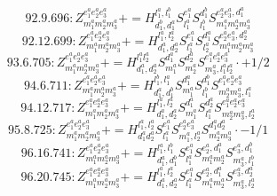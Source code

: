 \documentclass[letterpaper,10pt,fleqn,leqno,onecolumn]{article}
\begin{document}
\begin{equation} \;\;\;\;\;\;  92.9.696: Z^{e_{1}^{a}e_{2}^{a}e_{3}^{a}}_{m_{1}^{a}m_{2}^{a}m_{3}^{a}}+=H^{l_{1}^{a},l_{1}^{b}}_{d_{1}^{b},d_{1}^{a}}S^{e_{1}^{a}}_{l_{1}^{a}}S^{d_{1}^{b}}_{l_{1}^{b}}S^{e_{2}^{a}e_{3}^{a},d_{1}^{a}}_{m_{1}^{a}m_{2}^{a}m_{3}^{a}} \end{equation}
\begin{equation} \;\;\;\;\;\;  92.12.699: Z^{e_{1}^{a}e_{2}^{a}e_{3}^{a}}_{m_{1}^{a}m_{2}^{a}m_{3}^{a}}+=H^{l_{1}^{a},l_{2}^{a}}_{d_{1}^{a},d_{2}^{a}}S^{e_{1}^{a}}_{l_{1}^{a}}S^{d_{1}^{a}}_{l_{2}^{a}}S^{e_{2}^{a}e_{3}^{a},d_{2}^{a}}_{m_{1}^{a}m_{2}^{a}m_{3}^{a}} \end{equation}
\begin{equation} \;\;\;\;\;\;  93.6.705: Z^{e_{1}^{a}e_{2}^{a}e_{3}^{a}}_{m_{1}^{a}m_{2}^{a}m_{3}^{a}}+=H^{l_{1}^{a}l_{2}^{a}}_{d_{1}^{a},d_{2}^{a}}S^{d_{1}^{a}}_{m_{1}^{a}}S^{d_{2}^{a}}_{m_{2}^{a}}S^{e_{1}^{a}e_{2}^{a}e_{3}^{a}}_{m_{3}^{a},l_{1}^{a}l_{2}^{a}}\cdot +1/2 \end{equation}
\begin{equation} \;\;\;\;\;\;  94.6.711: Z^{e_{1}^{a}e_{2}^{a}e_{3}^{a}}_{m_{1}^{a}m_{2}^{a}m_{3}^{a}}+=H^{l_{1}^{b},l_{1}^{a}}_{d_{1}^{a},d_{1}^{b}}S^{d_{1}^{a}}_{m_{1}^{a}}S^{d_{1}^{b}}_{l_{1}^{b}}S^{e_{1}^{a}e_{2}^{a}e_{3}^{a}}_{m_{2}^{a}m_{3}^{a},l_{1}^{a}} \end{equation}
\begin{equation} \;\;\;\;\;\;  94.12.717: Z^{e_{1}^{a}e_{2}^{a}e_{3}^{a}}_{m_{1}^{a}m_{2}^{a}m_{3}^{a}}+=H^{l_{1}^{a},l_{2}^{a}}_{d_{1}^{a},d_{2}^{a}}S^{d_{1}^{a}}_{m_{1}^{a}}S^{d_{2}^{a}}_{l_{1}^{a}}S^{e_{1}^{a}e_{2}^{a}e_{3}^{a}}_{m_{2}^{a}m_{3}^{a},l_{2}^{a}} \end{equation}
\begin{equation} \;\;\;\;\;\;  95.8.725: Z^{e_{1}^{a}e_{2}^{a}e_{3}^{a}}_{m_{1}^{a}m_{2}^{a}m_{3}^{a}}+=H^{l_{1}^{a},l_{2}^{a}}_{d_{1}^{a}d_{2}^{a}}S^{e_{1}^{a}}_{l_{1}^{a}}S^{e_{2}^{a}e_{3}^{a}}_{m_{1}^{a},l_{2}^{a}}S^{d_{1}^{a}d_{2}^{a}}_{m_{2}^{a}m_{3}^{a}}\cdot -1/1 \end{equation}
\begin{equation} \;\;\;\;\;\;  96.16.741: Z^{e_{1}^{a}e_{2}^{a}e_{3}^{a}}_{m_{1}^{a}m_{2}^{a}m_{3}^{a}}+=H^{l_{1}^{a},l_{1}^{b}}_{d_{1}^{a},d_{1}^{b}}S^{e_{1}^{a}}_{l_{1}^{a}}S^{e_{2}^{a},d_{1}^{a}}_{m_{1}^{a}m_{2}^{a}}S^{e_{3}^{a},d_{1}^{b}}_{m_{3}^{a},l_{1}^{b}} \end{equation}
\begin{equation} \;\;\;\;\;\;  96.20.745: Z^{e_{1}^{a}e_{2}^{a}e_{3}^{a}}_{m_{1}^{a}m_{2}^{a}m_{3}^{a}}+=H^{l_{1}^{a},l_{2}^{a}}_{d_{1}^{a},d_{2}^{a}}S^{e_{1}^{a}}_{l_{1}^{a}}S^{e_{2}^{a},d_{1}^{a}}_{m_{1}^{a}m_{2}^{a}}S^{e_{3}^{a},d_{2}^{a}}_{m_{3}^{a},l_{2}^{a}} \end{equation}
\end{document}
